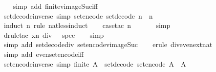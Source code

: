 \begin{isabellebody}
\ \ \isamarkupfalse%
\ {\isacharparenleft}simp\ add{\isacharcolon}\ finite{\isacharunderscore}vimage{\isacharunderscore}Suc{\isacharunderscore}iff{\isacharparenright}\isanewline
\ \ \isamarkupfalse%
%
\endisatagproof
{\isafoldproof}%
%
\isadelimproof
%
\endisadelimproof
%
\isadelimdocument
%
\endisadelimdocument
%
\isatagdocument
%
\isamarkuptrue%
%
\endisatagdocument
{\isafolddocument}%
%
\isadelimdocument
%
\endisadelimdocument
{}\isamarkupfalse%
\ set{\isacharunderscore}decode{\isacharunderscore}inverse\ {\isacharbrackleft}simp{\isacharbrackright}{\isacharcolon}\ {\isachardoublequoteopen}set{\isacharunderscore}encode\ {\isacharparenleft}set{\isacharunderscore}decode\ n{\isacharparenright}\ {\isacharequal}\ n{\isachardoublequoteclose}\isanewline
%
\isadelimproof
\ \ %
\endisadelimproof
%
\isatagproof
{}\isamarkupfalse%
\ {\isacharparenleft}induct\ n\ rule{\isacharcolon}\ nat{\isacharunderscore}less{\isacharunderscore}induct{\isacharparenright}\isanewline
\ \ \isamarkupfalse%
\ {\isacharparenleft}case{\isacharunderscore}tac\ {\isachardoublequoteopen}n\ {\isacharequal}\ {}{\isachardoublequoteclose}{\isacharparenright}\isanewline
\ \ \ \isamarkupfalse%
\ simp\isanewline
\ \ \isamarkupfalse%
\ {\isacharparenleft}drule{\isacharunderscore}tac\ x{\isacharequal}{\isachardoublequoteopen}n\ div\ {}{\isachardoublequoteclose}\ \ spec{\isacharparenright}\isanewline
\ \ \isamarkupfalse%
\ simp\isanewline
\ \ \isamarkupfalse%
\ {\isacharparenleft}simp\ add{\isacharcolon}\ set{\isacharunderscore}decode{\isacharunderscore}div{\isacharunderscore}{}\ set{\isacharunderscore}encode{\isacharunderscore}vimage{\isacharunderscore}Suc{\isacharparenright}\isanewline
\ \ \isamarkupfalse%
\ {\isacharparenleft}erule\ div{}{\isacharunderscore}even{\isacharunderscore}ext{\isacharunderscore}nat{\isacharparenright}\isanewline
\ \ \isamarkupfalse%
\ {\isacharparenleft}simp\ add{\isacharcolon}\ even{\isacharunderscore}set{\isacharunderscore}encode{\isacharunderscore}iff{\isacharparenright}\isanewline
\ \ \isamarkupfalse%
%
\endisatagproof
{\isafoldproof}%
%
\isadelimproof
\isanewline
%
\endisadelimproof
\isanewline
{}\isamarkupfalse%
\ set{\isacharunderscore}encode{\isacharunderscore}inverse\ {\isacharbrackleft}simp{\isacharbrackright}{\isacharcolon}\ {\isachardoublequoteopen}finite\ A\ {\isasymLongrightarrow}\ set{\isacharunderscore}decode\ {\isacharparenleft}set{\isacharunderscore}encode\ A{\isacharparenright}\ {\isacharequal}\ A{\isachardoublequoteclose}\isanewline

\end{isabellebody}
